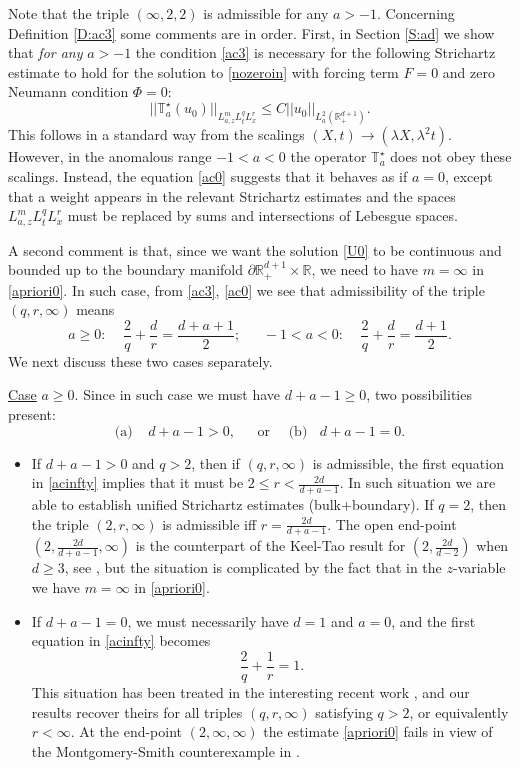 \documentclass[11pt,letter]{amsart}
\def \RN {\mathbb{R}_+^{d+1}}
\def \R {\mathbb{R}}
\newcommand{\p}{\partial}
\newcommand{\la}{\lambda}
\numberwithin{equation}{section}
\numberwithin{equation}{section}
\begin{document}
Note that the triple $(\infty,2,2)$ is admissible for any $a>-1$. Concerning Definition \ref{D:ac3} some comments are in order.
First, in Section \ref{S:ad} we show that \emph{for any} $a>-1$ the condition \eqref{ac3} is necessary for the following Strichartz estimate to hold for the solution to \eqref{nozeroin} with forcing term $F = 0$ and zero Neumann condition $\Phi=0$:
\begin{equation}\label{apriori0}
||\mathbb T^\star_a(u_0)||_{L^m_{a,z} L^q_t L^r_x } \le C ||u_0||_{L^2_a(\RN)}.
\end{equation}
This follows in a standard way from the scalings $(X,t)\to (\la X,\la^2 t)$. However, in the anomalous range $-1<a<0$ the operator $\mathbb T^\star_a$ does not obey these scalings. Instead, the equation \eqref{ac0} suggests that it behaves as if $a = 0$, except that a weight appears in the relevant Strichartz estimates and the spaces $L^m_{a,z} L^q_t L^r_x $ must be replaced by sums and intersections of Lebesgue spaces. 
  
A second comment is that, since we want the solution \eqref{U0} to be continuous and bounded up to the boundary manifold $\p \RN\times \R$, we need to have  $m=\infty$ in \eqref{apriori0}. In such case, 
from \eqref{ac3}, \eqref{ac0} we see that admissibility of the triple $(q,r,\infty)$ means
\begin{equation}\label{acinfty}
a\ge 0:\ \ \ \ \ \frac 2q +\frac dr = \frac{d+a+1}2;\ \ \ \ \ \ \  -1<a<0:\ \ \ \ \ 
\frac 2q +\frac dr = \frac{d+1}2.
\end{equation}
We next discuss these two cases separately. 

\vskip 0.2in

\noindent \underline{Case} $a\ge 0$. Since in such case we must have $d+a-1\ge 0$, two possibilities present:
\begin{equation}\label{a2}
\text{(a)}\ \ \ \ \ d+a-1>0,\ \ \ \ \ \ \  \text{or}\ \ \ \ \ \ \text{(b)}\ \ \ \ d+a-1=0.
\end{equation}
\begin{itemize}
\item[(a)] If $d+a-1>0$ and $q>2$, then if $(q,r,\infty)$ is admissible, the first equation in \eqref{acinfty} implies that it must be $2\le r < \frac{2d}{d+a-1}$. In such situation we are able to establish unified Strichartz estimates (bulk$+$boundary). If $q = 2$, then the triple $(2,r,\infty)$ is admissible iff $r = \frac{2d}{d+a-1}$. The open end-point $(2,\frac{2d}{d+a-1},\infty)$ is the counterpart of the Keel-Tao result for $(2,\frac{2d}{d-2})$ when $d\ge 3$, see \cite{KT, Taodis}, but the situation is complicated by the fact that in the $z$-variable we have $m=\infty$ in \eqref{apriori0}.  
\item[(b)] If $d+a-1=0$, we must necessarily have $d = 1$ and $a=0$, and the first equation in \eqref{acinfty} becomes
\[
\frac 2q +\frac 1r = 1.
\] 
This situation has been treated in the interesting recent work \cite{OST3}, and our results recover theirs for all triples $(q,r,\infty)$ satisfying $q>2$, or equivalently $r<\infty$. At the end-point $(2,\infty,\infty)$ the estimate \eqref{apriori0} fails in view of the Montgomery-Smith counterexample in \cite{MS}.  
\end{itemize}
\end{document}
